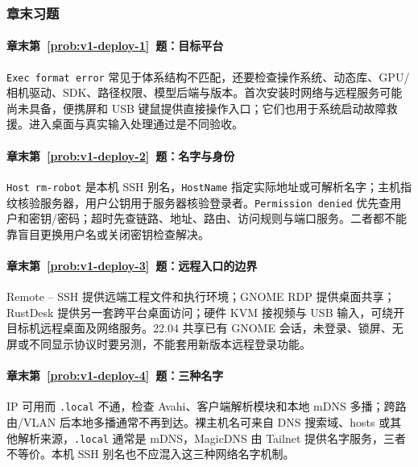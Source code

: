 \subsubsection*{章末习题}

\paragraph*{章末第~\ref{prob:v1-deploy-1}~题：目标平台}
\begin{solution}
\texttt{Exec format error} 常见于体系结构不匹配，还要检查操作系统、动态库、GPU/相机驱动、SDK、路径权限、模型后端与版本。首次安装时网络与远程服务可能尚未具备，便携屏和 USB 键鼠提供直接操作入口；它们也用于系统启动故障救援。进入桌面与真实输入处理通过是不同验收。
\end{solution}

\paragraph*{章末第~\ref{prob:v1-deploy-2}~题：名字与身份}
\begin{solution}
\texttt{Host rm-robot} 是本机 SSH 别名，\texttt{HostName} 指定实际地址或可解析名字；主机指纹核验服务器，用户公钥用于服务器核验登录者。\texttt{Permission denied} 优先查用户和密钥/密码；超时先查链路、地址、路由、访问规则与端口服务。二者都不能靠盲目更换用户名或关闭密钥检查解决。
\end{solution}

\paragraph*{章末第~\ref{prob:v1-deploy-3}~题：远程入口的边界}
\begin{solution}
Remote -- SSH 提供远端工程文件和执行环境；GNOME RDP 提供桌面共享；RustDesk 提供另一套跨平台桌面访问；硬件 KVM 接视频与 USB 输入，可绕开目标机远程桌面及网络服务。22.04 共享已有 GNOME 会话，未登录、锁屏、无屏或不同显示协议时要另测，不能套用新版本远程登录功能。
\end{solution}

\paragraph*{章末第~\ref{prob:v1-deploy-4}~题：三种名字}
\begin{solution}
IP 可用而 \texttt{.local} 不通，检查 Avahi、客户端解析模块和本地 mDNS 多播；跨路由/VLAN 后本地多播通常不再到达。裸主机名可来自 DNS 搜索域、hosts 或其他解析来源，\texttt{.local} 通常是 mDNS，MagicDNS 由 Tailnet 提供名字服务，三者不等价。本机 SSH 别名也不应混入这三种网络名字机制。
\end{solution}

